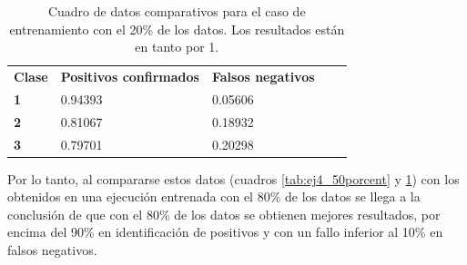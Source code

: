 \documentclass[10pt,a4paper]{article}
\begin{document}
\begin{table}[h!]
\centering
\begin{tabular}{|l|l|l|ll}
\cline{1-3}
\multicolumn{1}{|c|}{\textbf{Clase}} & \multicolumn{1}{c|}{\textbf{Positivos confirmados}} & \multicolumn{1}{c|}{\textbf{Falsos negativos}} & \multicolumn{1}{c}{\textbf{}} &  \\ \cline{1-3}
\textbf{1}                       &         0.94393                       &       0.05606                         &                               &  \\ \cline{1-3}
\textbf{2}                       &         0.81067                       &       0.18932                         &                               &  \\ \cline{1-3}
\textbf{3}                       &         0.79701                       &       0.20298                         &                               &  \\ \cline{1-3}
\end{tabular}
\caption{Cuadro de datos comparativos para el caso de entrenamiento con el 20\%{} de los datos. Los resultados están en tanto por 1.}
\label{tab:ej4_20porcent}
\end{table}

Por lo tanto, al compararse estos datos (cuadros \ref{tab:ej4_50porcent} y \ref{tab:ej4_20porcent}) con los obtenidos en una ejecución entrenada con el 80\%{} de los datos se llega a la conclusión de que con el 80\%{} de los datos se obtienen mejores resultados, por encima del 90\%{} en identificación de positivos y con un fallo inferior al 10\%{} en falsos negativos.
\end{document}
